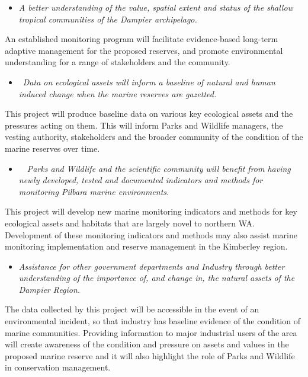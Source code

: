 \documentclass[version=last,
    paper=a4,                               %
    10pt,                                   %
    dvipsnames,
    oneside,                              %
    headings=openany,                       %
    open=any,
    BCOR=7mm,                               %
    DIV=15,     %
]{scrbook}
\providecommand{\tightlist}{\setlength{\itemsep}{0pt}\setlength{\parskip}{0pt}}
\begin{document}
\begin{itemize}
\tightlist
\item
  \emph{A better understanding of the value, spatial extent and status
  of the shallow tropical communities of the Dampier archipelago.}
\end{itemize}

An established monitoring program will facilitate evidence-based
long-term adaptive management for the proposed reserves, and promote
environmental understanding for a range of stakeholders and the
community.

\begin{itemize}
\tightlist
\item
  ~\emph{Data on ecological assets will inform a baseline of natural and
  human induced change when the marine reserves are gazetted.}
\end{itemize}

This project will produce baseline data on various key ecological assets
and the pressures acting on them. This will inform Parks and Wildlife
managers, the vesting authority, stakeholders and the broader community
of the condition of the marine reserves over time.

\begin{itemize}
\tightlist
\item
  ~~\emph{Parks and Wildlife and the scientific community will benefit
  from having newly developed, tested and documented indicators and
  methods for monitoring Pilbara marine environments.}
\end{itemize}

This project will develop new marine monitoring indicators and methods
for key ecological assets and habitats that are largely novel to
northern WA. Development of these monitoring indicators and methods may
also assist marine monitoring implementation and reserve management in
the Kimberley region.

\begin{itemize}
\tightlist
\item
  \emph{Assistance for other government departments and Industry through
  better understanding of the importance of, and change in, the natural
  assets of the Dampier Region.}
\end{itemize}

The data collected by this project will be accessible in the event of an
environmental incident, so that industry has baseline evidence of the
condition of marine communities. Providing information to major
industrial users of the area will create awareness of the condition and
pressure on assets and values in the proposed marine reserve and it will
also highlight the role of Parks and Wildlife in conservation
management.~
\end{document}
